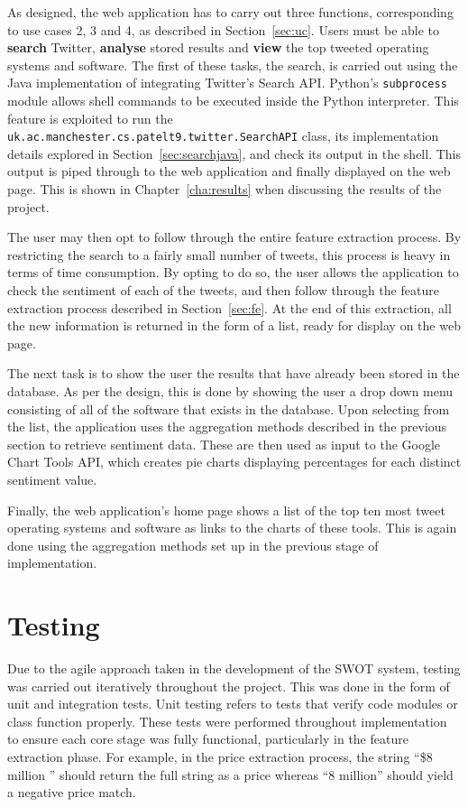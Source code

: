 As designed, the web application has to carry out three functions, corresponding to use cases 2, 3 and 4, as described in Section~\ref{sec:uc}. Users must be able to \textbf{search} Twitter, \textbf{analyse} stored results and \textbf{view} the top tweeted operating systems and software. The first of these tasks, the search, is carried out using the Java implementation of integrating Twitter's Search API. Python's \texttt{subprocess} module allows shell commands to be executed inside the Python interpreter. This feature is exploited to run the \\\texttt{uk.ac.manchester.cs.patelt9.twitter.SearchAPI} class, its implementation details explored in Section~\ref{sec:searchjava}, and check its output in the shell. This output is piped through to the web application and finally displayed on the web page. This is shown in Chapter~\ref{cha:results} when discussing the results of the project.

The user may then opt to follow through the entire feature extraction process. By restricting the search to a fairly small number of tweets, this process is heavy in terms of time consumption. By opting to do so, the user allows the application to check the sentiment of each of the tweets, and then follow through the feature extraction process described in Section~\ref{sec:fe}. At the end of this extraction, all the new information is returned in the form of a list, ready for display on the web page.

The next task is to show the user the results that have already been stored in the database. As per the design, this is done by showing the user a drop down menu consisting of all of the software that exists in the database. Upon selecting from the list, the application uses the aggregation methods described in the previous section to retrieve sentiment data. These are then used as input to the Google Chart Tools API, which creates pie charts displaying percentages for each distinct sentiment value.

Finally, the web application's home page shows a list of the top ten most tweet operating systems and software as links to the charts of these tools. This is again done using the aggregation methods set up in the previous stage of implementation.

\section{Testing}
Due to the agile approach taken in the development of the SWOT system, testing was carried out iteratively throughout the project. This was done in the form of unit and integration tests. Unit testing refers to tests that verify code modules or class function properly. These tests were performed throughout implementation to ensure each core stage was fully functional, particularly in the feature extraction phase. For example, in the price extraction process, the string ``\$8 million '' should return the full string as a price whereas ``8 million'' should yield a negative price match.

